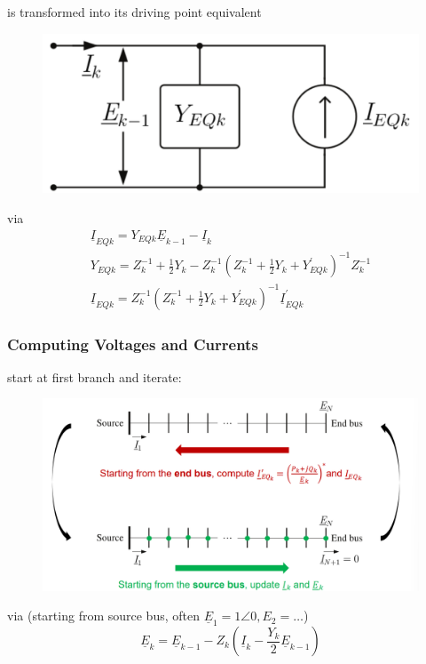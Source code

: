 \documentclass[a4paper,10pt,landscape]{scrartcl}
\begin{document}
\begin{multicols*}{3}
is transformed into its driving point equivalent
\begin{figure}[H]
    \centering
    \includegraphics[width=.6\linewidth]{src/norton_combine.png}
\end{figure}
via \\
$$\begin{gathered}
\underline{I}_{EQk} = Y_{EQk}\underline{E}_{k-1} - \underline{I}_k \\
Y_{E Q k}=Z_k^{-1}+\frac{1}{2} Y_k-Z_k^{-1}\left(Z_k^{-1}+\frac{1}{2} Y_k+Y_{E Q k}^{\prime}\right)^{-1} Z_k^{-1} \\ 
\underline{I}_{E Q k}=Z_k^{-1}\left(Z_k^{-1}+\frac{1}{2} Y_k+Y_{E Q k}^{\prime}\right)^{-1} \underline{I}_{E Q k}^{\prime}\end{gathered}$$

\subsubsection{Computing Voltages and Currents}
start at first branch and iterate:
\begin{figure}[H]
    \centering
    \includegraphics[width=1\linewidth]{src/network_reduction_method.png}
\end{figure}
via (starting from source bus, often $\underline{E}_1=1\angle 0, E_2=\dots$)
$$
\underline{E}_k = \underline{E}_{k-1} - Z_k \left(\underline{I}_k - \frac{Y_k}{2}\underline{E}_{k-1}\right)
$$


\end{multicols*}
\end{document}
